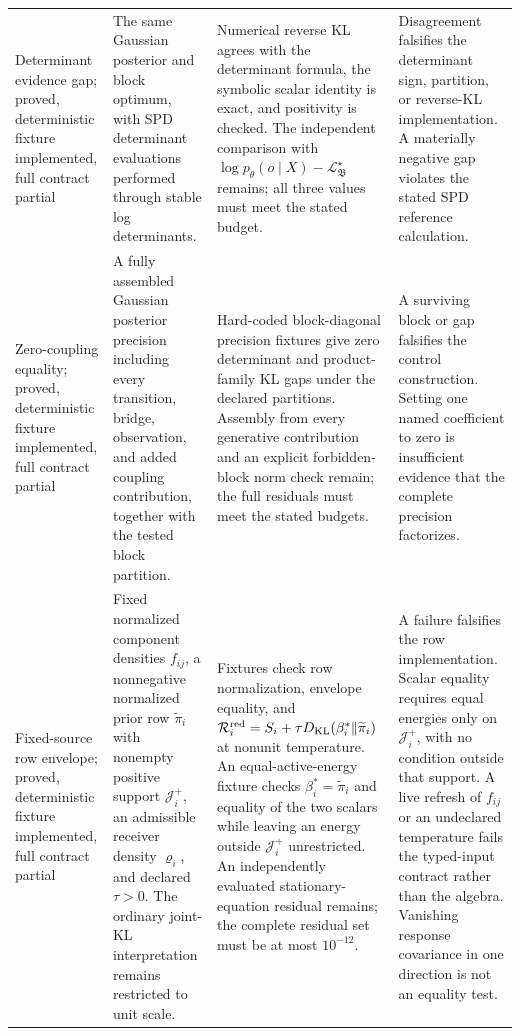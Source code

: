\begin{longtable}{>{\raggedright\arraybackslash}p{}>{\raggedright\arraybackslash}p{}>{\raggedright\arraybackslash}p{}>{\raggedright\arraybackslash}p{}}
\addlinespace
Determinant evidence gap; proved, deterministic fixture implemented, full contract partial & The same Gaussian posterior and block optimum, with SPD determinant evaluations performed through stable log determinants. & Numerical reverse KL agrees with the determinant formula, the symbolic scalar identity is exact, and positivity is checked. The independent comparison with \(\log p_\theta(o\mid X)-\mathcal L_{\mathfrak B}^\star\) remains; all three values must meet the stated budget. & Disagreement falsifies the determinant sign, partition, or reverse-KL implementation. A materially negative gap violates the stated SPD reference calculation. \\
\addlinespace
Zero-coupling equality; proved, deterministic fixture implemented, full contract partial & A fully assembled Gaussian posterior precision including every transition, bridge, observation, and added coupling contribution, together with the tested block partition. & Hard-coded block-diagonal precision fixtures give zero determinant and product-family KL gaps under the declared partitions. Assembly from every generative contribution and an explicit forbidden-block norm check remain; the full residuals must meet the stated budgets. & A surviving block or gap falsifies the control construction. Setting one named coefficient to zero is insufficient evidence that the complete precision factorizes. \\
\addlinespace
Fixed-source row envelope; proved, deterministic fixture implemented, full contract partial & Fixed normalized component densities \(f_{ij}\), a nonnegative normalized prior row \(\widetilde\pi_i\) with nonempty positive support \(\mathcal J_i^+\), an admissible receiver density \(\varrho_i\), and declared \(\tau>0\). The ordinary joint-KL interpretation remains restricted to unit scale. & Fixtures check row normalization, envelope equality, and \(\mathcal R_i^{\mathrm{red}}=S_i+\tau D_{\mathrm{KL}}(\beta_i^*\Vert\widetilde\pi_i)\) at nonunit temperature. An equal-active-energy fixture checks \(\beta_i^*=\widetilde\pi_i\) and equality of the two scalars while leaving an energy outside \(\mathcal J_i^+\) unrestricted. An independently evaluated stationary-equation residual remains; the complete residual set must be at most \(10^{-12}\). & A failure falsifies the row implementation. Scalar equality requires equal energies only on \(\mathcal J_i^+\), with no condition outside that support. A live refresh of \(f_{ij}\) or an undeclared temperature fails the typed-input contract rather than the algebra. Vanishing response covariance in one direction is not an equality test. \\

\end{longtable}
